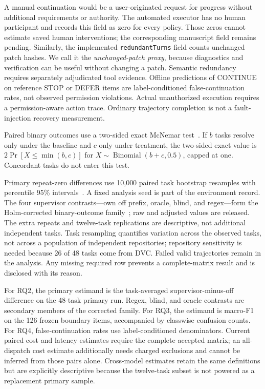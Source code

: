 \documentclass[sigconf,nonacm]{acmart}
\begin{document}
A manual continuation would be a user-originated request for progress without additional requirements or authority. The automated executor has no human participant and records this field as zero for every policy. Those zeros cannot estimate saved human interventions; the corresponding manuscript field remains pending. Similarly, the implemented \texttt{redundantTurns} field counts unchanged patch hashes. We call it the \emph{unchanged-patch proxy}, because diagnostics and verification can be useful without changing a patch. Semantic redundancy requires separately adjudicated tool evidence. Offline predictions of CONTINUE on reference STOP or DEFER items are label-conditioned false-continuation rates, not observed permission violations. Actual unauthorized execution requires a permission-aware action trace. Ordinary trajectory completion is not a fault-injection recovery measurement.

Paired binary outcomes use a two-sided exact McNemar test~\cite{mcnemar1947}. If $b$ tasks resolve only under the baseline and $c$ only under treatment, the two-sided exact value is $2\Pr[X\leq\min(b,c)]$ for $X\sim\operatorname{Binomial}(b+c,0.5)$, capped at one. Concordant tasks do not enter this test.

Primary repeat-zero differences use 10,000 paired task bootstrap resamples with percentile 95\% intervals~\cite{efron1993bootstrap}. A fixed analysis seed is part of the environment record. The four supervisor contrasts---own off prefix, oracle, blind, and regex---form the Holm-corrected binary-outcome family~\cite{holm1979}; raw and adjusted values are released. The extra repeats and twelve-task replications are descriptive, not additional independent tasks. Task resampling quantifies variation across the observed tasks, not across a population of independent repositories; repository sensitivity is needed because 26 of 48 tasks come from DVC. Failed valid trajectories remain in the analysis. Any missing required row prevents a complete-matrix result and is disclosed with its reason.

For RQ2, the primary estimand is the task-averaged supervisor-minus-off difference on the 48-task primary run. Regex, blind, and oracle contrasts are secondary members of the corrected family. For RQ3, the estimand is macro-F1 on the 126 frozen boundary items, accompanied by classwise confusion counts. For RQ4, false-continuation rates use label-conditioned denominators. Current paired cost and latency estimates require the complete accepted matrix; an all-dispatch cost estimate additionally needs charged exclusions and cannot be inferred from those pairs alone. Cross-model estimates retain the same definitions but are explicitly descriptive because the twelve-task subset is not powered as a replacement primary sample.
\end{document}
